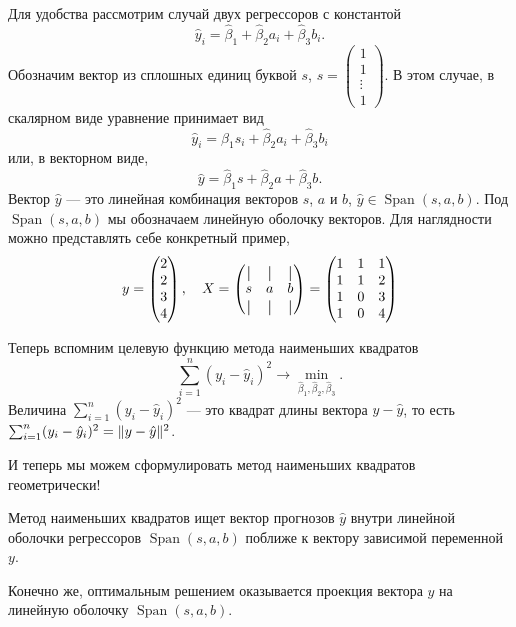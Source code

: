 \documentclass[12pt]{article}
\DeclareMathOperator{\Span}{Span}
\DeclarePairedDelimiter{\norm}{\lVert}{\rVert}
\newcommand*{\vertbar}{\rule[-1ex]{0.5pt}{2.5ex}}
\newcommand{\hb}{\hat{\beta}}
\newcommand{\hy}{\hat{y}}
\begin{document}
Для удобства рассмотрим случай двух регрессоров с константой
\[
\hy_i = \hb_1 + \hb_2 a_i + \hb_3 b_i.
\]
Обозначим вектор из сплошных единиц буквой $s$, $s = \begin{pmatrix}
    1 \\
    1 \\
    \vdots \\
    1
\end{pmatrix}$.
В этом случае, в скалярном виде уравнение принимает вид 
\[
\hy_i = \hb_1 s_i + \hb_2 a_i + \hb_3 b_i
\]
или, в векторном виде,
\[
\hy = \hb_1 s + \hb_2 a + \hb_3 b.
\]
Вектор $\hy$ — это линейная комбинация векторов $s$, $a$ и $b$,
$\hy \in \Span(s, a, b)$. 
Под $\Span(s, a, b)$ мы обозначаем линейную оболочку векторов.
Для наглядности можно представлять себе конкретный пример, 
\[
y = \begin{pmatrix}
    2 \\
    2 \\
    3 \\
    4 \\
\end{pmatrix}, \quad 
X = \begin{pmatrix}
    \vertbar & \vertbar & \vertbar \\
    s & a & b \\
    \vertbar & \vertbar & \vertbar \\    
\end{pmatrix} = \begin{pmatrix}
    1 & 1 & 1 \\
    1 & 1 & 2 \\
    1 & 0 & 3 \\
    1 & 0 & 4 \\
\end{pmatrix}
\]

Теперь вспомним целевую функцию метода наименьших квадратов
\[
\sum_{i=1}^n (y_i - \hy_i)^2 \to \min_{\hb_1, \hb_2, \hb_3}.
\]
Величина $\sum_{i=1}^n (y_i - \hy_i)^2$ — это квадрат длины вектора $y - \hy$, то есть $\sum_{i=1}^n (y_i - \hy_i)^2 = \norm{y - \hy}^2$.

И теперь мы можем сформулировать метод наименьших квадратов геометрически!
\begin{explanation}
    Метод наименьших квадратов ищет вектор прогнозов $\hy$ внутри линейной оболочки регрессоров $\Span(s, a, b)$ поближе к вектору  зависимой переменной $y$.
\end{explanation}

Конечно же, оптимальным решением оказывается проекция вектора $y$ на линейную оболочку $\Span(s, a, b)$.
\end{document}
